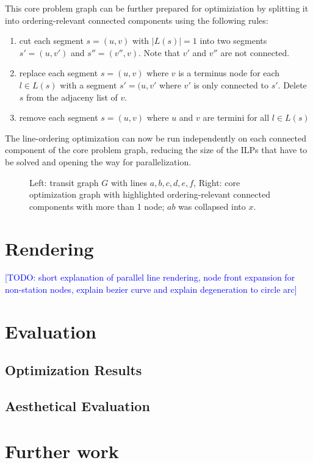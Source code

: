 \documentclass{llncs}
\newcommand\todo[1]{\textcolor{blue}{[TODO: #1]}}
\begin{document}
This core problem graph can be further prepared for optimiziation by splitting it into ordering-relevant connected components using the following rules:
\begin{enumerate}
	\item cut each segment $s = (u, v)$ with $|L(s)| = 1$ into two segments $s' = (u, v')$ and $s'' = (v'', v)$. Note that $v'$ and $v''$ are not connected.
	\item replace each segment $s = (u, v)$ where $v$ is a terminus node for each $l \in L(s)$ with a segment $s' = (u, v'$ where $v'$ is only connected to $s'$. Delete $s$ from the adjaceny list of $v$.
	\item remove each segment $s = (u, v)$ where $u$ and $v$ are termini for all $l \in L(s)$
\end{enumerate}
The line-ordering optimization can now be run independently on each connected component of the core problem graph, reducing the size of the ILPs that have to be solved and opening the way for parallelization.
\begin{figure}[h]
\centering
	
	\hspace{0.6cm}
	
	\caption{Left: transit graph $G$ with lines $a, b, c, d, e, f$, Right: core optimization graph with highlighted ordering-relevant connected components with more than 1 node; $ab$ was collapsed into $x$.}
\end{figure}

%
\section{Rendering}\label{SEC:rendering}
%
\todo{short explanation of parallel line rendering, node front expansion for non-station nodes, explain bezier curve and explain degeneration to circle arc}

%
\section{Evaluation}
%

%
\subsection{Optimization Results}
%

%
\subsection{Aesthetical Evaluation}
%

%
\section{Further work}
%


\end{document}
